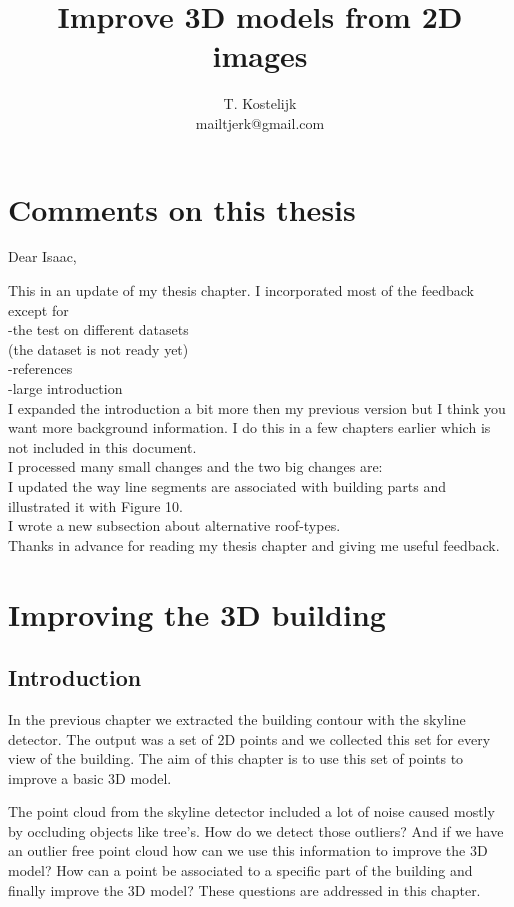 \documentclass[10pt]{article}
\title{\sc Improve 3D models from 2D images}
\author{T. Kostelijk\\mailtjerk@gmail.com}
\begin{document}
\maketitle




\section{Comments on this thesis}
Dear Isaac,

This in an update of my thesis chapter. I incorporated most of the feedback except for\\
-the test on different datasets\\
(the dataset is not ready yet)\\
-references\\
-large introduction\\
I expanded the introduction a bit more then my previous version but I think you want more background
information. I do this in a few chapters earlier which is not included in this document.\\
I processed many small changes and the two big changes are:\\
I updated the way line segments are associated with building parts and illustrated it with Figure 10.\\
I wrote a new subsection about alternative roof-types.\\
Thanks in advance for reading my thesis chapter and giving me useful feedback.

 
\section{Improving the 3D building}
\subsection{Introduction}
In the previous chapter we extracted the building contour with the skyline
detector. The output was a set of 2D points and we collected this set for every
view of the building.  The aim of this chapter is to use this set of points to
improve a basic 3D model. 

The point cloud from the skyline detector included a lot of noise caused mostly
by occluding objects like tree's. How do we detect those outliers?
And if we have an outlier free point cloud how can we use this information to
improve the 3D model? How can a point be associated to a specific part of the
building and finally improve the 3D model? 
These questions are addressed in this chapter.
\end{document}
